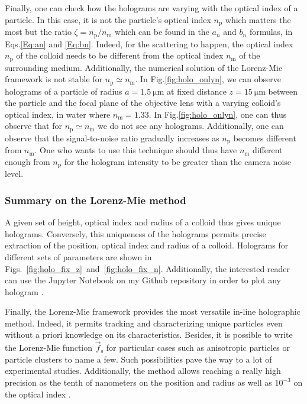 Finally, one can check how the holograms are varying with the optical index of a particle. In this case, it is not the particle's optical index $n_\mathrm{p}$ which matters the most but the ratio $\zeta = n_\mathrm{p} / n_\mathrm{m} $ which can be found in the $a_n$ and $b_n$ formulas, in Eqs.\ref{Eq:an} and \ref{Eq:bn}. Indeed, for the scattering to happen, the optical index $n_\mathrm{p}$ of the colloid needs to be different from the optical index $n_\mathrm{m}$ of the surrounding medium. Additionally, the numerical solution of the Lorenz-Mie framework is not stable for $n_\mathrm{p} \simeq n_\mathrm{m}$. In Fig.\ref{fig:holo_onlyn}, we can observe holograms of a particle of radius $a = 1.5 ~ \mathrm{\mu m}$ at fixed distance $z=15 ~ \mathrm{\mu m}$ between the particle and the focal plane of the objective lens with a varying colloid's optical index, in water where $n_\mathrm{m} = 1.33$. In Fig.\ref{fig:holo_onlyn}, one can thus observe that for  $n_\mathrm{p} \simeq n_\mathrm{m}$ we do not see any holograms.  Additionally, one can observe that the signal-to-noise ratio gradually increases as $n_\mathrm{p}$ becomes different from $n_\mathrm{m}$. One who wants to use this technique should thus have $n_\mathrm{m}$ different enough from $n_\mathrm{p}$ for the hologram intensity to be greater than the camera noise level.






\subsubsection{Summary on the Lorenz-Mie method}\mbox{} \newline

A given set of height, optical index and radius of a colloid thus gives unique holograms. Conversely, this uniqueness of the holograms permits precise extraction of the position, optical index and radius of a colloid. Holograms for different sets of parameters are shown in Figs.~\ref{fig:holo_fix_z}~and~\ref{fig:holo_fix_n}. Additionally, the interested reader can use  the Jupyter Notebook on my Github repository in order to plot any hologram \href{https://github.com/eXpensia/Ma-these/blob/main/02_body/chapter2/images/holo_size_exemple/holosize_variation.ipynb}{\faGithub}.  

Finally, the Lorenz-Mie framework provides the most versatile in-line holographic method. Indeed, it permits tracking and characterizing unique particles even without a priori knowledge on its characteristics. Besides, it is possible to write the Lorenz-Mie function $\vec{f}_\mathrm{s}$ for particular cases such as anisotropic particles \cite{fung_holographic_2013, wang_using_2014} or particle clusters \cite{fung_holographic_2013, perry_real-space_2013} to name a few. Such possibilities pave the way to a lot of experimental studies. Additionally, the method allows reaching a really high precision as the tenth of nanometers on the position and radius as well as $10^{-3}$ on the optical index \cite{lee_characterizing_2007}. 

